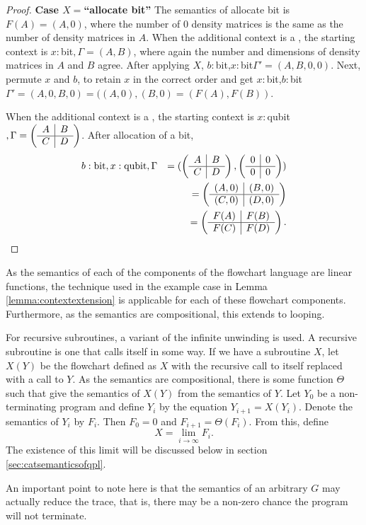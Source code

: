\begin{proof}
  \textbf{Case $X=$``allocate bit''}
  The semantics of allocate bit is $F(A) = (A,0)$, where the number of $0$ density matrices is the same as the number
  of density matrices in $A$. When the additional context is a \bit, the starting context is $x:$bit$,\Gamma=(A,B)$, where again the number and
  dimensions of density matrices in $A$ and $B$ agree. After applying $X$,
  $b:$bit,$x:$bit$\Gamma'=(A,B,0,0)$. Next, permute $x$ and $b$, to retain $x$ in the correct order and get
  $x:$bit,$b:$bit$\Gamma'=(A,0,B,0) = ((A,0),(B,0) = (F(A),F(B))$.

  When the additional context is a \qubit, the starting context is $x:$qubit$,\Gamma=\qsmat{A}{B}{C}{D}$. After allocation of a bit,
  \begin{eqnarray*}
    &b:\text{bit},x:\text{qubit},\Gamma&=(\qsmat{A}{B}{C}{D}, \qsmat{0}{0}{0}{0}) \\
    &&= \qsmat{(A,0)}{(B,0)}{(C,0)}{(D,0)}\\
    &&=\qsmat{F(A)}{F(B)}{F(C)}{F(D)}.
  \end{eqnarray*}
\end{proof}

As the semantics of each of the components of the flowchart language are linear functions, the
technique used in the example case in Lemma \ref{lemma:contextextension} is applicable for each of
these flowchart components. Furthermore, as the semantics are compositional, this extends to
looping.

For recursive subroutines, a variant of the infinite unwinding is used. A recursive subroutine is
one that calls itself in some way. If we have a subroutine $X$, let $X(Y)$ be the flowchart defined
as $X$ with the recursive call to itself replaced with a call to $Y$. As the semantics are
compositional, there is some function $\Theta$ such that give the semantics of $X(Y)$ from the
semantics of $Y$. Let $Y_{0}$ be a non-terminating program and define $Y_{i}$ by the equation
$Y_{i+1} = X(Y_{i})$. Denote the semantics of $Y_{i}$ by $F_{i}$. Then $F_{0} = 0$ and $F_{i+1} =
\Theta(F_{i})$. From this, define
\begin{equation}\label{eqn:semrecursion}
  X =\lim_{i\to\infty}F_{i}.
\end{equation}
The existence of this limit will be discussed below in section \ref{sec:catsemanticsofqpl}.

An important point to note here is that the semantics of an arbitrary $G$ may actually reduce the
trace, that is, there may be a non-zero chance the program will not terminate.

